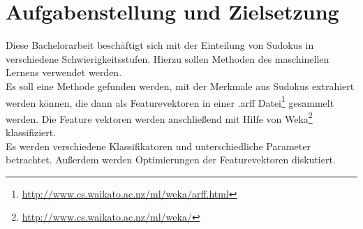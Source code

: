 \chapter{Aufgabenstellung und Zielsetzung}
Diese Bachelorarbeit beschäftigt sich mit der Einteilung von Sudokus in verschiedene Schwierigkeitsstufen. Hierzu sollen Methoden des maschinellen Lernens verwendet werden. \\ Es soll eine Methode gefunden werden, mit der Merkmale aus Sudokus extrahiert werden können, die dann als Featurevektoren in einer .arff Datei\footnote{\url{http://www.cs.waikato.ac.nz/ml/weka/arff.html}} gesammelt werden. Die Feature vektoren werden anschließend mit Hilfe von Weka\footnote{\url{http://www.cs.waikato.ac.nz/ml/weka/}} klassifiziert.\\
Es werden verschiedene Klassifikatoren und unterschiedliche Parameter betrachtet. Außerdem werden Optimierungen der Featurevektoren diskutiert.